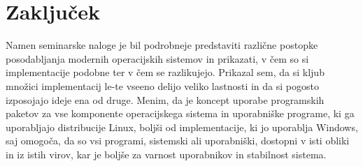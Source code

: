 \section{Zaključek}

Namen seminarske naloge je bil podrobneje predstaviti različne postopke posodabljanja modernih operacijskih sistemov
in prikazati, v čem so si implementacije podobne ter v čem se razlikujejo.
Prikazal sem, da si kljub množici implementacij le-te vseeno delijo veliko lastnosti in da si pogosto izposojajo
ideje ena od druge.
Menim, da je koncept uporabe programskih paketov za vse komponente operacijskega sistema in uporabniške programe,
ki ga uporabljajo distribucije Linux, boljši od implementacije, ki jo uporablja Windows, saj omogoča, da so vsi
programi, sistemski ali uporabniški, dostopni v isti obliki in iz istih virov, kar je boljše za varnost uporabnikov in
stabilnost sistema.